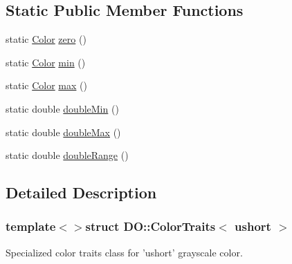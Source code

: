 \subsection*{Static Public Member Functions}
\begin{DoxyCompactItemize}
\item 
static \hyperlink{struct_d_o_1_1_color_traits_3_01ushort_01_4_a1ef69be3e9e9a4da299f5111fc591a79}{Color} \hyperlink{struct_d_o_1_1_color_traits_3_01ushort_01_4_a57b00f8db42515f404e06ab933932125}{zero} ()
\item 
static \hyperlink{struct_d_o_1_1_color_traits_3_01ushort_01_4_a1ef69be3e9e9a4da299f5111fc591a79}{Color} \hyperlink{struct_d_o_1_1_color_traits_3_01ushort_01_4_a1cd81f912af766f8004e4d5a82a7128b}{min} ()
\item 
static \hyperlink{struct_d_o_1_1_color_traits_3_01ushort_01_4_a1ef69be3e9e9a4da299f5111fc591a79}{Color} \hyperlink{struct_d_o_1_1_color_traits_3_01ushort_01_4_aded391d5e231096e135e08760c0fbeb6}{max} ()
\item 
static double \hyperlink{struct_d_o_1_1_color_traits_3_01ushort_01_4_aa122aba748bfd453a27d2c30b368dbc3}{double\-Min} ()
\item 
static double \hyperlink{struct_d_o_1_1_color_traits_3_01ushort_01_4_ab9fb6b1bb12e23b725453a69f6193c30}{double\-Max} ()
\item 
static double \hyperlink{struct_d_o_1_1_color_traits_3_01ushort_01_4_aed64f95e634b8dac0ae5a0aed2b45740}{double\-Range} ()
\end{DoxyCompactItemize}


\subsection{Detailed Description}
\subsubsection*{template$<$$>$struct D\-O\-::\-Color\-Traits$<$ ushort $>$}

Specialized color traits class for 'ushort' grayscale color. 

